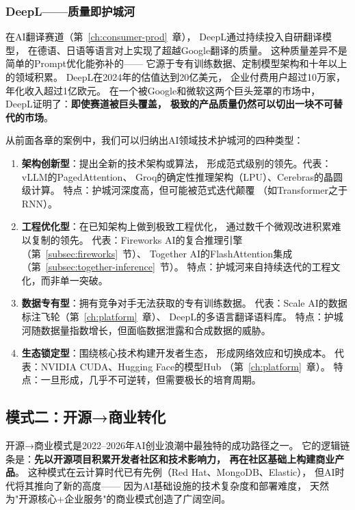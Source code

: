\subsubsection{DeepL——质量即护城河}
在AI翻译赛道（第~\ref{ch:consumer-prod}~章），
DeepL通过持续投入自研翻译模型，
在德语、日语等语言对上实现了超越Google翻译的质量。
这种质量差异不是简单的Prompt优化能弥补的——
它源于专有训练数据、定制模型架构和十年以上的领域积累。
DeepL在2024年的估值达到20亿美元，
企业付费用户超过10万家，年化收入超过1亿欧元。
在一个被Google和微软这两个巨头笼罩的市场中，
DeepL证明了：\textbf{即使赛道被巨头覆盖，
极致的产品质量仍然可以切出一块不可替代的市场}。

\begin{keybox}[技术护城河的四种类型]
从前面各章的案例中，我们可以归纳出AI领域技术护城河的四种类型：
\begin{enumerate}
  \item \textbf{架构创新型}：提出全新的技术架构或算法，
    形成范式级别的领先。代表：vLLM的PagedAttention、
    Groq的确定性推理架构（LPU）、Cerebras的晶圆级计算。
    特点：护城河深度高，但可能被范式迭代颠覆
    （如Transformer之于RNN）。
  \item \textbf{工程优化型}：在已知架构上做到极致工程优化，
    通过数千个微观改进积累难以复制的领先。
    代表：Fireworks AI的复合推理引擎（第~\ref{subsec:fireworks}~节）、
    Together AI的FlashAttention集成
    （第~\ref{subsec:together-inference}~节）。
    特点：护城河来自持续迭代的工程文化，而非单一突破。
  \item \textbf{数据专有型}：拥有竞争对手无法获取的专有训练数据。
    代表：Scale AI的数据标注飞轮（第~\ref{ch:platform}~章）、
    DeepL的多语言翻译语料库。
    特点：护城河随数据量指数增长，但面临数据泄露和合成数据的威胁。
  \item \textbf{生态锁定型}：围绕核心技术构建开发者生态，
    形成网络效应和切换成本。
    代表：NVIDIA CUDA、Hugging Face的模型Hub
    （第~\ref{ch:platform}~章）。
    特点：一旦形成，几乎不可逆转，但需要极长的培育周期。
\end{enumerate}
\end{keybox}


\subsection{模式二：开源→商业转化}

开源→商业模式是2022--2026年AI创业浪潮中最独特的成功路径之一。
它的逻辑链条是：\textbf{先以开源项目积累开发者社区和技术影响力，
再在社区基础上构建商业产品}。
这种模式在云计算时代已有先例（Red Hat、MongoDB、Elastic），
但AI时代将其推向了新的高度——
因为AI基础设施的技术复杂度和部署难度，
天然为"开源核心+企业服务"的商业模式创造了广阔空间。

